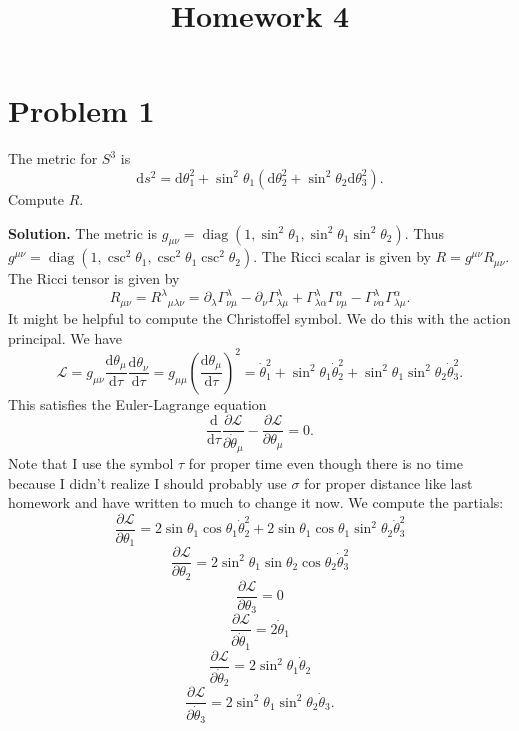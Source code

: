 \documentclass[11pt, letterpaper]{article}
\title{Homework 4}
\begin{document}
\makeproblem

\section{Problem 1}
\begin{problem}\label{1.1}
	The metric for $S^3$ is
	\[
		\mathrm{d} s^2=\mathrm{d} \theta _1^2+\sin ^2\theta _1\left( \mathrm{d} \theta _2^2+\sin ^2\theta _2\mathrm{d} \theta _3^2 \right) 
	.\]
	Compute $R$.
\end{problem}
\noindent \textbf{Solution.} The metric is $g_{\mu \nu } =\operatorname{diag} \left( 1, \sin ^2\theta _1,\sin ^2\theta _1 \sin ^2\theta _2 \right) $. Thus $g^{\mu \nu } =\operatorname{diag} \left( 1, \csc ^2\theta _1, \csc ^2\theta _1 \csc ^2\theta _2 \right) $. The Ricci scalar is given by $R=g^{\mu \nu } R_{\mu \nu } $. The Ricci tensor is given by
\[
	R_{\mu \nu } =R^\lambda \!_{\mu \lambda \nu } =\partial_\lambda \Gamma ^\lambda_{\nu \mu } -\partial _\nu \Gamma ^\lambda _{\lambda \mu } +\Gamma ^\lambda _{\lambda \alpha } \Gamma ^\alpha _{\nu \mu } -\Gamma ^\lambda _{\nu \alpha } \Gamma ^\alpha _{\lambda \mu } 
.\]
It might be helpful to compute the Christoffel symbol. We do this with the action principal. We have
\[
	\mathcal{L} =g_{\mu \nu } \frac{\mathrm{d}\theta_\mu }{\mathrm{d}\tau } \frac{\mathrm{d}\theta _\nu }{\mathrm{d}\tau } =g_{\mu \mu } \left( \frac{\mathrm{d}\theta _\mu }{\mathrm{d}\tau }  \right) ^2=\dot{\theta}_1^2 + \sin ^2\theta _1 \dot{\theta } _2^2 + \sin ^2\theta _1 \sin ^2\theta _2 \dot{\theta } _3^2
.\]
This satisfies the Euler-Lagrange equation
\[
	\frac{\mathrm{d}}{\mathrm{d}\tau } \frac{\partial \mathcal{L} }{\partial \dot{\theta } _\mu } - \frac{\partial \mathcal{L} }{\partial \theta _\mu } =0
.\]
Note that I use the symbol $\tau $ for proper time even though there is no time because I didn't realize I should probably use $\sigma $ for proper distance like last homework and have written to much to change it now. We compute the partials:
\[
	\frac{\partial \mathcal{L} }{\partial \theta _1} =2 \sin \theta _1 \cos \theta _1 \dot{\theta } _2^2 + 2 \sin \theta _1 \cos \theta _1 \sin ^2\theta _2 \dot{\theta } _3^2
\]
\[
	\frac{\partial \mathcal{L} }{\partial \theta _2} =2 \sin ^2 \theta _1 \sin \theta _2 \cos \theta _2 \dot{\theta } _3^2
\]
\[
	\frac{\partial \mathcal{L} }{\partial \theta _3} =0
\]
\[
	\frac{\partial \mathcal{L} }{\partial \dot{\theta } _1} =2 \dot{\theta } _1
\]
\[
	\frac{\partial \mathcal{L} }{\partial \dot{\theta } _2} =2 \sin ^2\theta _1 \dot{\theta } _2
\]
\[
	\frac{\partial \mathcal{L} }{\partial \dot{\theta } _3} =2 \sin ^2\theta _1 \sin ^2\theta _2 \dot{\theta } _3
.\]
\end{document}
